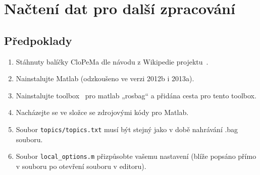 \documentclass[10pt,a4paper,titlepage,oneside]{report}
\begin{document}


\chapter{Načtení dat pro další zpracování}
\label{chap:matlab}
\section{Předpoklady}
\begin{enumerate}
  \item Stáhnuty balíčky CloPeMa dle návodu z Wikipedie projektu~\cite{wikiPack}.
  
  \item Nainstalujte Matlab (odzkoušeno ve verzi 2012b i 2013a).
  \item Nainstalujte toolbox~\cite{toolbox} pro matlab „rosbag“ a přidána cesta pro tento toolbox. %
  \item Nacházejte se ve složce se zdrojovými kódy pro Matlab.
  \item Soubor \verb|topics/topics.txt| musí být stejný jako v době nahrávání .bag souboru.
  \item Soubor \verb|local_options.m| přizpůsobte vašemu nastavení (blíže popsáno přímo v souboru po otevření souboru v editoru).
\end{enumerate}
\end{document}
